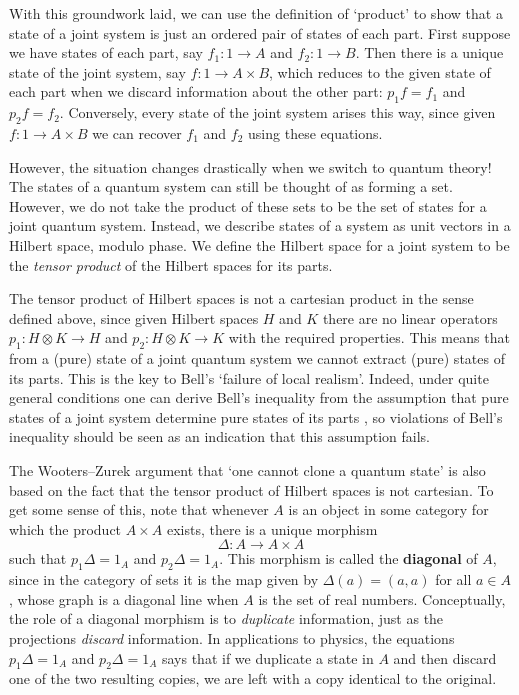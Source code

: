 \documentclass[12pt]{article}
\renewcommand{\to}{\rightarrow}
\newcommand{\maps}{\colon}
\newcommand{\tensor}{\otimes}
\begin{document}
With this groundwork laid, we can use the definition of `product' to
show that a state of a joint system is just an ordered pair of states
of each part.  First suppose we have states of each part, say $f_1
\maps 1 \to A$ and $f_2 \maps 1 \to B$.  Then there is a unique state
of the joint system, say $f \maps 1 \to A \times B$, which reduces to
the given state of each part when we discard information about the
other part: $p_1 f = f_1$ and $p_2 f = f_2$.  Conversely, every state
of the joint system arises this way, since given $f \maps 1 \to A
\times B$ we can recover $f_1$ and $f_2$ using these equations.

However, the situation changes drastically when we switch to 
quantum theory!  The states of a quantum system can still be 
thought of as forming a set.  However, we do not 
take the product of these sets to be the set of 
states for a joint quantum system.   Instead, we describe 
states of a system as unit vectors in a Hilbert space, modulo
phase.  We define the Hilbert space for a joint system to be the
{\it tensor product} of the Hilbert spaces for its parts.

The tensor product of Hilbert spaces is not a cartesian product
in the sense defined above, since given Hilbert spaces
$H$ and $K$ there are no linear operators
$p_1 \maps H \tensor K \to H$ and $p_2 \maps H \tensor K \to K$
with the required properties.  This means that from a
(pure) state of a joint quantum system we cannot extract 
(pure) states of its parts.  This is the key to Bell's `failure
of local realism'.  Indeed, under quite general conditions
one can derive Bell's inequality from the assumption that pure
states of a joint system determine pure states
of its parts \cite{B0,Bell}, so violations of Bell's inequality should
be seen as an indication that this assumption fails.  

The Wooters--Zurek argument that `one cannot clone a quantum state' 
\cite{WZ} is also based on the fact that the tensor product of Hilbert 
spaces is not cartesian.  To get some sense of this, note that 
whenever $A$ is an object in some category for which the product 
$A \times A$ exists, there is a unique morphism 
\[ \Delta \maps A \to A \times A \]
such that $p_1 \Delta = 1_A$ and $p_2 \Delta = 1_A$.  This morphism is
called the {\bf diagonal} of $A$, since in the category of sets it
is the map given by $\Delta(a) = (a,a)$ for all $a \in A$, whose graph
is a diagonal line when $A$ is the set of real numbers.
Conceptually, the role of a diagonal morphism is to {\it duplicate}
information, just as the projections {\it discard} information.  In
applications to physics, the equations $p_1 \Delta = 1_A$ and 
$p_2 \Delta = 1_A$ says that if we duplicate a state in $A$ and then 
discard one of the two resulting copies, we are left with a copy 
identical to the original.  
\end{document}
